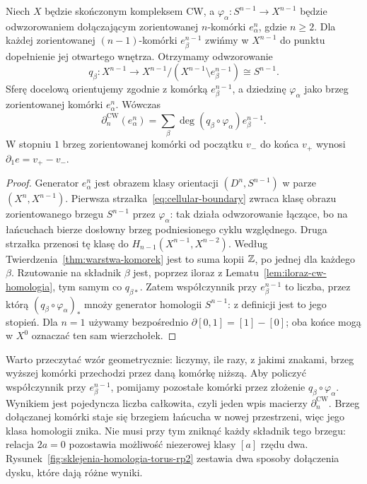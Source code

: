 \begin{twierdzenie}
\label{thm:formula-komorkowa}
Niech $X$ będzie skończonym kompleksem CW, a
$\varphi_\alpha:S^{n-1}\to X^{n-1}$
będzie odwzorowaniem dołączającym
zorientowanej $n$-komórki
$e_\alpha^n$, gdzie $n\geq2$.
Dla każdej zorientowanej
$(n-1)$-komórki $e_\beta^{n-1}$
zwińmy w $X^{n-1}$ do punktu
dopełnienie jej otwartego wnętrza.
Otrzymamy odwzorowanie
\[
 q_\beta:X^{n-1}\longrightarrow
 X^{n-1}/(X^{n-1}\setminus e_\beta^{n-1})
 \cong S^{n-1}.
\]
Sferę docelową orientujemy zgodnie z komórką $e_\beta^{n-1}$,
a dziedzinę $\varphi_\alpha$ jako brzeg zorientowanej komórki $e_\alpha^n$.
Wówczas
\begin{equation}\label{eq:formula-komorkowa}
 \partial_n^{\mathrm{CW}}(e_\alpha^n)
 =\sum_{\beta}
 \deg(q_\beta\circ\varphi_\alpha)
 e_\beta^{n-1}.
\end{equation}
W stopniu $1$ brzeg zorientowanej
komórki od początku $v_-$ do końca
$v_+$ wynosi $\partial_1e=v_+-v_-$.
\end{twierdzenie}
\begin{proof}
Generator $e_\alpha^n$ jest
obrazem klasy orientacji
$(D^n,S^{n-1})$ w parze
$(X^n,X^{n-1})$. Pierwsza
strzałka~\eqref{eq:cellular-boundary}
zwraca klasę obrazu
zorientowanego brzegu $S^{n-1}$
przez $\varphi_\alpha$:
tak działa odwzorowanie łączące,
bo na łańcuchach bierze
dosłowny brzeg podniesionego
cyklu względnego.
Druga strzałka przenosi tę
klasę do
$H_{n-1}(X^{n-1},X^{n-2})$.
Według
Twierdzenia~\ref{thm:warstwa-komorek}
jest to suma kopii $\mathbb{Z}$,
po jednej dla każdego $\beta$.
Rzutowanie na składnik $\beta$
jest, poprzez iloraz z
Lematu~\ref{lem:iloraz-cw-homologia},
tym samym co $q_{\beta*}$.
Zatem współczynnik przy
$e_\beta^{n-1}$ to liczba,
przez którą
$(q_\beta\circ\varphi_\alpha)_*$
mnoży generator homologii
$S^{n-1}$: z definicji
jest to jego stopień.
Dla $n=1$ używamy
bezpośrednio
$\partial[0,1]=[1]-[0]$;
oba końce mogą w $X^0$
oznaczać ten sam wierzchołek.
\end{proof}

Warto przeczytać wzór geometrycznie:
liczymy, ile razy, z jakimi znakami,
brzeg wyższej komórki przechodzi
przez daną komórkę niższą. Aby policzyć współczynnik przy
$e_\beta^{n-1}$, pomijamy pozostałe komórki przez złożenie
$q_\beta\circ\varphi_\alpha$. Wynikiem jest pojedyncza liczba całkowita,
czyli jeden wpis macierzy $\partial_n^{\mathrm{CW}}$.
Brzeg dołączanej komórki staje się brzegiem łańcucha w nowej przestrzeni,
więc jego klasa homologii
znika. Nie musi przy tym zniknąć każdy składnik tego brzegu:
relacja $2a=0$ pozostawia możliwość niezerowej klasy $[a]$ rzędu dwa.
Rysunek~\ref{fig:sklejenia-homologia-torus-rp2} zestawia
dwa sposoby dołączenia dysku, które dają różne wyniki.

